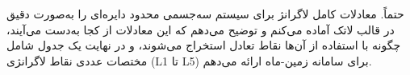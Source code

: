 حتماً. معادلات کامل لاگرانژ برای سیستم سه‌جسمی محدود دایره‌ای را به‌صورت دقیق در قالب لاتک آماده می‌کنم و توضیح می‌دهم که این معادلات از کجا به‌دست می‌آیند، چگونه با استفاده از آن‌ها نقاط تعادل استخراج می‌شوند، و در نهایت یک جدول شامل مختصات عددی نقاط لاگرانژی (L1 تا L5) برای سامانه زمین-ماه ارائه می‌دهم.
%
%		
%		
%		
%		
%		
%		
%		
%		
%		
%		
%		
%		


